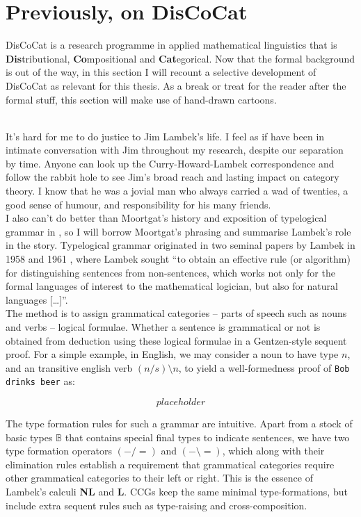 \section{Previously, on DisCoCat}

DisCoCat is a research programme in applied mathematical linguistics that is \textbf{Dis}tributional, \textbf{Co}mpositional and \textbf{Cat}egorical. Now that the formal background is out of the way, in this section I will recount a selective development of DisCoCat as relevant for this thesis. As a break or treat for the reader after the formal stuff, this section will make use of hand-drawn cartoons.

\\

It's hard for me to do justice to Jim Lambek's life. I feel as if have been in intimate conversation with Jim throughout my research, despite our separation by time. Anyone can look up the Curry-Howard-Lambek correspondence and follow the rabbit hole to see Jim's broad reach and lasting impact on category theory. I know that he was a jovial man who always carried a wad of twenties, a good sense of humour, and responsibility for his many friends.\\

I also can't do better than Moortgat's history and exposition of typelogical grammar in \citep{}, so I will borrow Moortgat's phrasing and summarise Lambek's role in the story. Typelogical grammar originated in two seminal papers by Lambek in 1958 and 1961 \citep{}, where Lambek sought “to obtain an effective rule (or algorithm) for distinguishing sentences from non-sentences, which works not only for the formal languages of interest to the mathematical logician, but also for natural languages […]”.\\

The method is to assign grammatical categories -- parts of speech such as nouns and verbs -- logical formulae. Whether a sentence is grammatical or not is obtained from deduction using these logical formulae in a Gentzen-style sequent proof. For a simple example, in English, we may consider a noun to have type $n$, and an transitive english verb $(n/s)\setminus n$, to yield a well-formedness proof of \texttt{Bob drinks beer} as:

\[placeholder\]

The type formation rules for such a grammar are intuitive. Apart from a stock of basic types $\mathbb{B}$ that contains special final types to indicate sentences, we have two type formation operators $(-/=)$ and $(- \setminus =)$, which along with their elimination rules establish a requirement that grammatical categories require other grammatical categories to their left or right. This is the essence of Lambek's calculi \textbf{NL} and \textbf{L}. CCGs keep the same minimal type-formations, but include extra sequent rules such as type-raising and cross-composition.\\

